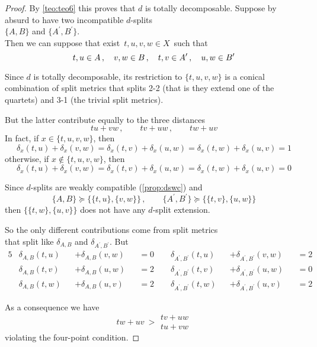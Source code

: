\documentclass[./main.tex]{subfiles}
\begin{document}
\begin{proof}
    By \autoref{teo:teo6} this proves that $d$ is totally decomposable. \bigskip
\clearpage
    Suppose by absurd to have two incompatible $d$-splits \\[1pt]
    \bsp $\{A,B\}$ and $\{A^\prime,B^\prime\}$. \\[1pt]
    Then we can suppose that exist $\, t,u,v,w \in X \,$ such that
    \[ t,u \in A \,, \quad v,w \in B \,, \quad t,v \in A^\prime \,, \quad u,w \in B^\prime \nospblw \]

    Since $d$ is totally decomposable, its restriction to $\{t,u,v,w\}$ is a conical combination of split metrics that splits 2-2 (that is they extend one of the quartets) and 3-1 (the trivial split metrics).
    
    But the latter contribute equally to the three distances
    \[ tu + vw \,, \qquad tv + uw \,, \qquad tw + uv \]
    In fact, if $x \in \{t,u,v,w\}$, then
    \[ \delta_x(t,u) + \delta_x(v,w) = \delta_x(t,v) + \delta_x(u,w) = \delta_x(t,w) + \delta_x(u,v) = 1 \]
    otherwise, if $x \not\in \{t,u,v,w\}$, then
    \[ \delta_x(t,u) + \delta_x(v,w) = \delta_x(t,v) + \delta_x(u,w) = \delta_x(t,w) + \delta_x(u,v) = 0 \]

    Since $d$-splits are weakly compatible (\autoref{prop:dswc}) and
    \[ \{A,B\} \succcurlyeq \bigl\{ \{t,u\},\{v,w\} \bigr\} \,, \qquad \{A^\prime,B^\prime\} \succcurlyeq \bigl\{ \{t,v\},\{u,w\} \bigr\} \]
    then $\bigl\{ \{t,w\},\{u,v\} \bigr\}$ does not have any $d$-split extension.

    So the only different contributions come from split metrics \\
    \bsp that split like $\delta_{A,B}$ and $\delta_{A^\prime,B^\prime}$. But
    \begin{alignat*}{5}
        &\delta_{A,B}(t,u) &&+ \delta_{A,B}(v,w) &&= 0 \qquad \delta_{A^\prime,B^\prime}(t,u) &&+ \delta_{A^\prime,B^\prime}(v,w) &&= 2 \\
        &\delta_{A,B}(t,v) &&+ \delta_{A,B}(u,w) &&= 2 \qquad \delta_{A^\prime,B^\prime}(t,v) &&+ \delta_{A^\prime,B^\prime}(u,w) &&= 0 \\
        &\delta_{A,B}(t,w) &&+ \delta_{A,B}(u,v) &&= 2 \qquad \delta_{A^\prime,B^\prime}(t,w) &&+ \delta_{A^\prime,B^\prime}(u,v) &&= 2
    \end{alignat*}

    As a consequence we have
    \[ tw + uv \ >
        \begin{array}{l}
            tv + uw \\
            tu + vw
        \end{array}
    \]
    violating the four-point condition. \absurd
\end{proof}
\end{document}

